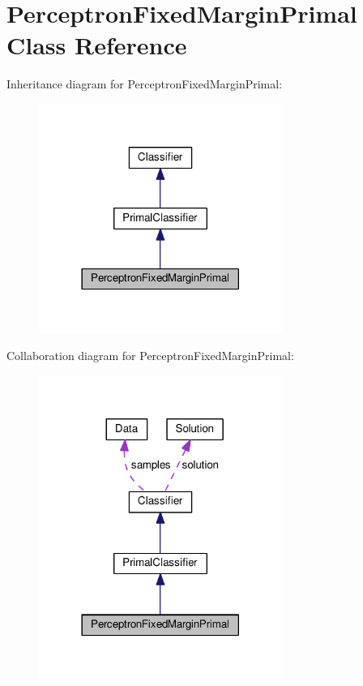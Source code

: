\hypertarget{class_perceptron_fixed_margin_primal}{}\section{Perceptron\+Fixed\+Margin\+Primal Class Reference}
\label{class_perceptron_fixed_margin_primal}


Inheritance diagram for Perceptron\+Fixed\+Margin\+Primal\+:
\nopagebreak
\begin{figure}[H]
\begin{center}
\leavevmode
\includegraphics[width=225pt]{class_perceptron_fixed_margin_primal__inherit__graph}
\end{center}
\end{figure}


Collaboration diagram for Perceptron\+Fixed\+Margin\+Primal\+:
\nopagebreak
\begin{figure}[H]
\begin{center}
\leavevmode
\includegraphics[width=225pt]{class_perceptron_fixed_margin_primal__coll__graph}
\end{center}
\end{figure}
